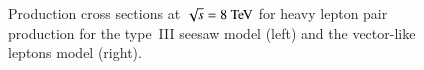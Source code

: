 \begin{figure}[htbp]
	\centering
	\hfill
	\caption{Production cross sections at $\sqrt{s}=8 \TeV$ for heavy lepton pair production for the type~III seesaw model (left) and the vector-like leptons model (right).}
	\label{fig:resonance-production-cross-sections}
\end{figure}


